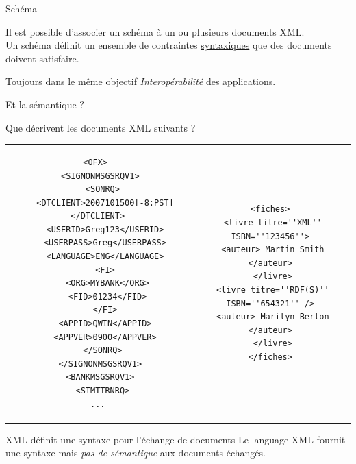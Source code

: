 \begin{frame}[containsverbatim]{Sch\'ema}

Il est possible d'associer un sch\'ema \`a un ou plusieurs documents XML.\\
Un sch\'ema d\'efinit un ensemble de contraintes \underline{syntaxiques} que des documents doivent satisfaire.

\begin{footnotesize}



\end{footnotesize}

\begin{block}{Toujours dans le m\^eme objectif}
\textit{Interop\'erabilit\'e} des applications.
\end{block}


\end{frame}


\begin{frame}[containsverbatim]{Et la s\'emantique ?}

Que d\'ecrivent les documents XML suivants ?
\begin{tabular}{cc}
\begin{minipage}{0.45\textwidth}
\begin{lstlisting}[basicstyle=\tiny]
<OFX> 
 <SIGNONMSGSRQV1>
  <SONRQ>
   <DTCLIENT>2007101500[-8:PST]</DTCLIENT>
   <USERID>Greg123</USERID>
   <USERPASS>Greg</USERPASS>
   <LANGUAGE>ENG</LANGUAGE>
   <FI>
    <ORG>MYBANK</ORG>
    <FID>01234</FID>
   </FI>
   <APPID>QWIN</APPID>
   <APPVER>0900</APPVER>
  </SONRQ>
 </SIGNONMSGSRQV1>
 <BANKMSGSRQV1>
  <STMTTRNRQ>
...
\end{lstlisting}
\end{minipage}
&
\begin{minipage}{0.45\textwidth}
\begin{lstlisting}[basicstyle=\tiny]
<fiches>
 <livre titre=''XML'' ISBN=''123456''>
 <auteur> Martin Smith </auteur>
 </livre>
 <livre titre=''RDF(S)'' ISBN=''654321'' />
 <auteur> Marilyn Berton </auteur>
 </livre>
</fiches>
\end{lstlisting}
\end{minipage}
\end{tabular}

\begin{alertblock}{XML d\'efinit une syntaxe pour l'\'echange de documents}
Le language XML fournit une syntaxe mais \textit{pas de s\'emantique} aux documents \'echang\'es.
\end{alertblock}


\end{frame}


